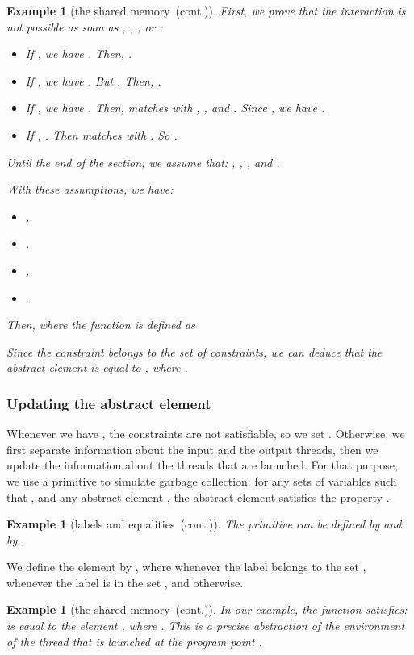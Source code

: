\documentclass{article}
\newcommand{\boxexample}{}
\newtheorem{example}[thm]{Example}
\newcommand{\pp}[1]{}
\newcommand{\memlabf}{6}
\newcommand{\continued}{(cont.)}
\newcommand{\cfadomain}{labels and equalities}
\newcommand{\ccfadomain}{\cfadomain\ \continued}
\newcommand{\shareanalysis}{the shared memory}
\newcommand{\cflowanalysis}{\shareanalysis\ \continued}
\begin{document}
\begin{example}[\cflowanalysis]
First, we prove that the interaction is not possible as soon as 
, , , or   :
\begin{itemize} 
\item If , we have  . Then,  .
\item If , we have  . 
But . 
Then, .
\item 
If , we have .
Then,  matches  with , , and .
Since , we have .
\item 
If  , 
 . Then  matches  with 
. So 
.
\end{itemize}

Until the end of the section, we assume that: , , , and . 

With these assumptions, we have:
\begin{itemize}
\item , 
\item , 
\item , 
\item .
\end{itemize}
Then,  
where the function  is defined as 

Since the constraint  belongs to 
the set  of constraints, we can deduce that the abstract element  is equal to , where .
\boxexample\end{example}

\subsubsection{Updating the abstract element}

Whenever we have , the constraints are not satisfiable, so we set . Otherwise, we first separate information about the input and the output threads, then we update the information about the threads that are launched. For that purpose, we use a primitive   to simulate garbage collection: for any sets  of variables such that , and any abstract element , the  abstract element  satisfies the property .


\begin{example}[\ccfadomain]
The primitive  can be defined by   and  by .
\boxexample\end{example}

We define the element   by , where  whenever the label  belongs to  the set , 
  whenever 
the label  is in the set , 
and   otherwise.

\begin{example}[\cflowanalysis]
In our example, the function  satisfies:   is equal to the element , where . This is a precise abstraction of the environment of the thread that is launched at the program point \pp{\memlabf}.
\end{example}
\end{document}
